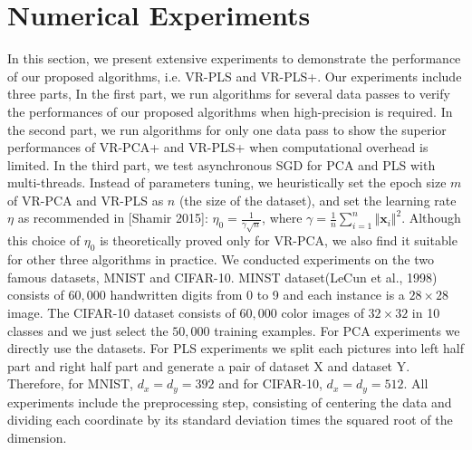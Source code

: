 \documentclass[conference]{IEEEtran}
\begin{document}
 
 \section{Numerical Experiments}
 \label{experiments}
 In this section, we present extensive experiments to demonstrate the performance of our proposed algorithms, i.e. VR-PLS and VR-PLS+. Our experiments include three parts, 
 In the first part, we run algorithms for several data passes to verify the performances of our proposed algorithms when high-precision is required.
 In the second part, we run algorithms for only one data pass to show the superior performances of VR-PCA+ and VR-PLS+ when computational overhead is limited.
 In the third part, we test asynchronous SGD for PCA and PLS with multi-threads.  
  Instead of parameters tuning, we heuristically set the epoch size $m$ of VR-PCA and VR-PLS as $n$ (the size of the dataset), and set the learning rate $\eta$ as recommended in [Shamir 2015]: $\eta_0 = \frac{1}{\gamma\sqrt{n}}$, where $\gamma = \frac{1}{n}\sum\limits_{i=1}^{n}{\Vert \mathbf{x}_i\Vert}^2$. Although this choice of $\eta_0$ is theoretically proved only for VR-PCA, we also find it suitable for other three algorithms in practice.
  We conducted experiments on the two famous datasets, MNIST and CIFAR-10. MINST dataset(LeCun et al., 1998) consists of $60,000$ handwritten digits from 0 to 9 and each instance is a $28 \times 28$ image. The CIFAR-10 dataset consists of $60,000$ color images of $32 \times 32$ in 10 classes and we just select the $50,000$ training examples. 
  For PCA experiments we directly use the datasets. For PLS experiments we split each pictures into left half part and right half part and generate a pair of dataset X and dataset Y. Therefore, for MNIST, $d_x = d_y = 392$ and for CIFAR-10, $d_x = d_y = 512$.
 All experiments include the preprocessing step, consisting of centering the data and dividing each coordinate by its standard deviation times the squared root of the dimension. 
 
\end{document}
